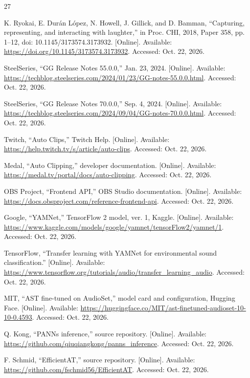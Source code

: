 \begin{thebibliography}{27}

K. Ryokai, E. Durán López, N. Howell, J. Gillick, and D. Bamman, ``Capturing, representing, and interacting with laughter,'' in Proc. CHI, 2018, Paper 358, pp. 1--12, doi: 10.1145/3173574.3173932. [Online]. Available: \url{https://doi.org/10.1145/3173574.3173932}. Accessed: Oct. 22, 2026.

SteelSeries, ``GG Release Notes 55.0.0,'' Jan. 23, 2024. [Online]. Available: \url{https://techblog.steelseries.com/2024/01/23/GG-notes-55.0.0.html}. Accessed: Oct. 22, 2026.

SteelSeries, ``GG Release Notes 70.0.0,'' Sep. 4, 2024. [Online]. Available: \url{https://techblog.steelseries.com/2024/09/04/GG-notes-70.0.0.html}. Accessed: Oct. 22, 2026.

Twitch, ``Auto Clips,'' Twitch Help. [Online]. Available: \url{https://help.twitch.tv/s/article/auto-clips}. Accessed: Oct. 22, 2026.

Medal, ``Auto Clipping,'' developer documentation. [Online]. Available: \url{https://medal.tv/portal/docs/auto-clipping}. Accessed: Oct. 22, 2026.

OBS Project, ``Frontend API,'' OBS Studio documentation. [Online]. Available: \url{https://docs.obsproject.com/reference-frontend-api}. Accessed: Oct. 22, 2026.

Google, ``YAMNet,'' TensorFlow 2 model, ver. 1, Kaggle. [Online]. Available: \url{https://www.kaggle.com/models/google/yamnet/tensorFlow2/yamnet/1}. Accessed: Oct. 22, 2026.

TensorFlow, ``Transfer learning with YAMNet for environmental sound classification.'' [Online]. Available: \url{https://www.tensorflow.org/tutorials/audio/transfer_learning_audio}. Accessed: Oct. 22, 2026.

MIT, ``AST fine-tuned on AudioSet,'' model card and configuration, Hugging Face. [Online]. Available: \url{https://huggingface.co/MIT/ast-finetuned-audioset-10-10-0.4593}. Accessed: Oct. 22, 2026.

Q. Kong, ``PANNs inference,'' source repository. [Online]. Available: \url{https://github.com/qiuqiangkong/panns_inference}. Accessed: Oct. 22, 2026.

F. Schmid, ``EfficientAT,'' source repository. [Online]. Available: \url{https://github.com/fschmid56/EfficientAT}. Accessed: Oct. 22, 2026.


\end{thebibliography}
